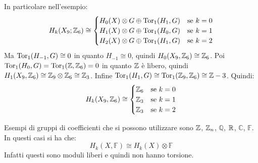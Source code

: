 In particolare nell'esempio:
\[
  H_k(X_9; \mathbb{Z}_6) \cong
  \begin{cases}
    H_0(X) \otimes G \oplus \mathrm{Tor_1}( H_1,G) & \text{se } k = 0 \\
    H_1(X) \otimes G \oplus \mathrm{Tor_1}( H_0,G) & \text{se } k = 1 \\
    H_2(X) \otimes G \oplus \mathrm{Tor_1}( H_1,G) & \text{se } k = 2
  \end{cases}
\]
Ma $ \mathrm{Tor_1}( H_{-1}, G) \cong 0 $ in quanto $ H_{-1} \cong 0 $, quindi
$ H_0(X_9, \mathbb{Z}_6) \cong \mathbb{Z}_6 $. Poi $ \mathrm{Tor_1}( H_0, G) = \mathrm{Tor_1}( \mathbb{Z}, \mathbb{Z}_6) = 0 $ in quanto
$ \mathbb{Z} $ è libero, quindi $ H_1(X_9, \mathbb{Z}_6) \cong \mathbb{Z}_9 \otimes \mathbb{Z}_6 \cong \mathbb{Z}_3 $. Infine
$ \mathrm{Tor_1}( H_1, G) \cong \mathrm{Tor_1}( \mathbb{Z}_9, \mathbb{Z}_6) \cong \mathbb{Z}-3 $. Quindi:
\[
  H_k(X_9, \mathbb{Z}_6) \cong
  \begin{cases}
    \mathbb{Z}_6 & \text{se } k = 0 \\
    \mathbb{Z}_3 & \text{se } k = 1 \\
    \mathbb{Z}_3 & \text{se } k = 2
  \end{cases}
\]

\begin{osservation}
  Esempi di gruppi di coefficienti che si possono utilizzare sono $ \mathbb{Z} $, $ \mathbb{Z}_n $,
  $ \mathbb{Q} $, $ \mathbb{R}^{} $, $ \mathbb{C} $, $ \mathbb{F} $. In questi casi si ha che:
  \[
    H_k(X, \mathbb{F}) \cong H_k(X) \otimes \mathbb{F}
  \]
  Infatti questi sono moduli liberi e quindi non hanno torsione.
\end{osservation}

